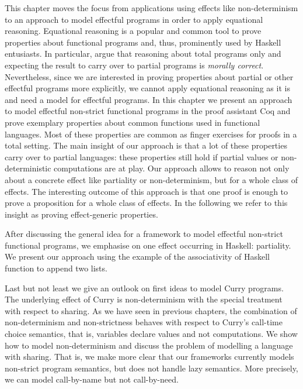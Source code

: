 
This chapter moves the focus from applications using effects like non-determinism to an approach to model effectful programs in order to apply equational reasoning.
Equational reasoning is a popular and common tool to prove properties about functional programs and, thus, prominently used by Haskell entusiasts. \citep{jeuring2012testing, gibbons2011just, hutton2008reasoning}
In particular, \citet{danielsson2006fast} argue that reasoning about total programs only and expecting the result to carry over to partial programs is \textit{morally correct}.
Nevertheless, since we are interested in proving properties about partial or other effectful programs more explicitly, we cannot apply equational reasoning as it is and need a model for effectful programs.
In this chapter we present an approach to model effectful non-strict functional programs in the proof assistant Coq and prove exemplary properties about common functions used in functional languages.
Most of these properties are common as finger exercises for proofs in a total setting.
The main insight of our approach is that a lot of these properties carry over to partial languages: these properties still hold if partial values or non-deterministic computations are at play.
Our approach allows to reason not only about a concrete effect like partiality or non-determinism, but for a whole class of effects.
The interesting outcome of this approach is that one proof is enough to prove a proposition for a whole class of effects.
In the following we refer to this insight as proving effect-generic properties.

After discussing the general idea for a framework to model effectful non-strict functional programs, we emphasise on one effect occurring in Haskell: partiality.
We present our approach using the example of the associativity of Haskell function to append two lists.

Last but not least we give an outlook on first ideas to model Curry programs.
The underlying effect of Curry is non-determinism with the special treatment with respect to sharing.
As we have seen in previous chapters, the combination of non-determinism and non-strictness behaves with respect to Curry's call-time choice semantics, that is, variables declare values and not computations.
We show how to model non-determinism and discuss the problem of modelling a language with sharing.
That is, we make more clear that our frameworks currently models non-strict program semantics, but does not handle lazy semantics.
More precisely, we can model call-by-name but not call-by-need.

